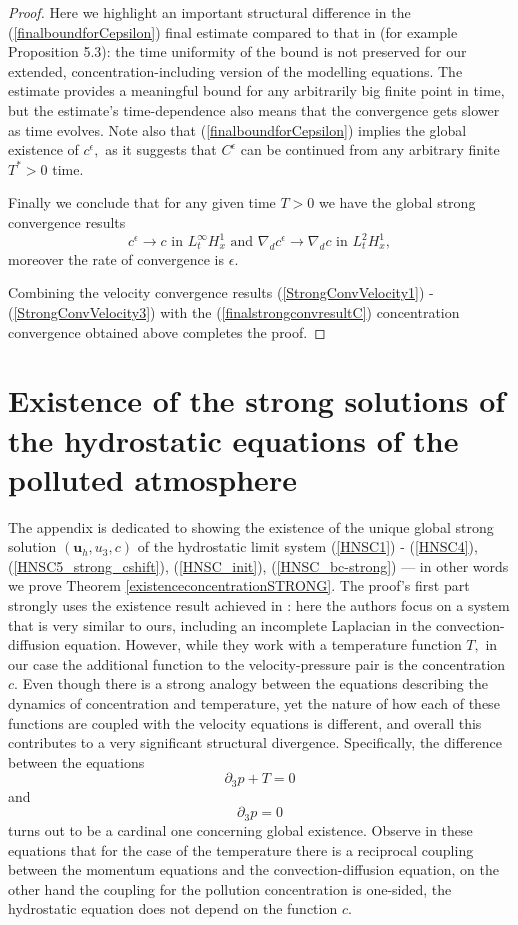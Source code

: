 \documentclass[11pt, a4paper]{article}
\begin{document}
\begin{proof}
Here we highlight an important structural difference in the (\ref{finalboundforCepsilon}) final estimate compared to that in \cite{li2019primitive} (for example Proposition 5.3): the time uniformity of the bound is not preserved for our extended, concentration-including version of the modelling equations. The estimate provides a meaningful bound for any arbitrarily big finite point in time, but the estimate's time-dependence also means that the convergence gets slower as time evolves. Note also that (\ref{finalboundforCepsilon}) implies the global existence of $c^\epsilon,$ as it suggests that $C^\epsilon$ can be continued from any arbitrary finite $T^* > 0$ time.

Finally we conclude that for any given time $T > 0$ we have the global strong convergence results
%
\begin{equation} \label{finalstrongconvresultC}
c^\epsilon \to c \text{ in } L_t^\infty H_x^1 \text{ and } \nabla_d c^\epsilon \to \nabla_d c \text{ in } L_t^2 H_x^1,
\end{equation}
%
moreover the rate of convergence is $\epsilon.$

Combining the velocity convergence results (\ref{StrongConvVelocity1}) - (\ref{StrongConvVelocity3}) with the (\ref{finalstrongconvresultC}) concentration convergence obtained above completes the proof.

\end{proof}

\appendix

\section{Existence of the strong solutions of the hydrostatic equations of the polluted atmosphere}

The appendix is dedicated to showing the existence of the unique global strong solution $(\mathbf{u}_h, u_3, c)$ of the hydrostatic limit system (\ref{HNSC1}) - (\ref{HNSC4}), (\ref{HNSC5_strong_cshift}), (\ref{HNSC_init}), (\ref{HNSC_bc-strong}) --- in other words we prove Theorem \ref{existenceconcentrationSTRONG}. The proof's first part strongly uses the existence result achieved in \cite{cao2014local}: here the authors focus on a system that is very similar to ours, including an incomplete Laplacian in the convection-diffusion equation. However, while they work with a temperature function $T,$ in our case the additional function to the velocity-pressure pair is the concentration $c.$ Even though there is a strong analogy between the equations describing the dynamics of concentration and temperature, yet the nature of how each of these functions are coupled with the velocity equations is different, and overall this contributes to a very significant structural divergence. Specifically, the difference between the equations $$ \partial_3 p + T = 0$$ and $$ \partial_3 p = 0$$ turns out to be a cardinal one concerning global existence. Observe in these equations that for the case of the temperature there is a reciprocal coupling between the momentum equations and the convection-diffusion equation, on the other hand the coupling for the pollution concentration is one-sided, the hydrostatic equation does not depend on the function $c.$
\end{document}
